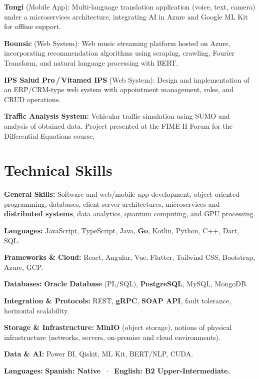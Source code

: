 \documentclass[10pt, letterpaper]{article}
\begin{document}
\smallskip
\noindent\textbf{\color{darkgray}Tongi} \textcolor{midgray}{(Mobile App):}
\textcolor{midgray}{Multi-language translation application (voice, text, camera) under a microservices architecture, integrating AI in Azure and Google ML Kit for offline support.}

\smallskip
\noindent\textbf{\color{darkgray}Bounsic} \textcolor{midgray}{(Web System):}
\textcolor{midgray}{Web music streaming platform hosted on Azure, incorporating recommendation algorithms using scraping, crawling, Fourier Transform, and natural language processing with BERT.}

\smallskip
\noindent\textbf{\color{darkgray}IPS Salud Pro\,/\,Vitamed IPS} \textcolor{midgray}{(Web System):}
\textcolor{midgray}{Design and implementation of an ERP/CRM-type web system with appointment management, roles, and CRUD operations.}

\smallskip
\noindent\textbf{\color{darkgray}Traffic Analysis System:}
\textcolor{midgray}{Vehicular traffic simulation using SUMO and analysis of obtained data. Project presented at the FIME II Forum for the Differential Equations course.}
\normalsize

\section{Technical Skills}

{\small
\noindent\textbf{\color{darkgray}General Skills:}
\textcolor{midgray}{Software and web/mobile app development, object-oriented programming, databases, client-server architectures, microservices and \textbf{distributed systems}, data analytics, quantum computing, and GPU processing.}

\noindent\textbf{\color{darkgray}Languages:}
\textcolor{midgray}{JavaScript, TypeScript, Java, \textbf{Go}, Kotlin, Python, C++, Dart, SQL.}

\noindent\textbf{\color{darkgray}Frameworks \& Cloud:}
\textcolor{midgray}{React, Angular, Vue, Flutter, Tailwind CSS, Bootstrap, Azure, GCP.}

\noindent\textbf{\color{darkgray}Databases:}
\textcolor{midgray}{\textbf{Oracle Database} (PL/SQL), \textbf{PostgreSQL}, MySQL, MongoDB.}

\noindent\textbf{\color{darkgray}Integration \& Protocols:}
\textcolor{midgray}{REST, \textbf{gRPC}, \textbf{SOAP API}, fault tolerance, horizontal scalability.}

\noindent\textbf{\color{darkgray}Storage \& Infrastructure:}
\textcolor{midgray}{\textbf{MinIO} (object storage), notions of physical infrastructure (networks, servers, on-premise and cloud environments).}

\noindent\textbf{\color{darkgray}Data \& AI:}
\textcolor{midgray}{Power BI, Qiskit, ML Kit, BERT/NLP, CUDA.}

\noindent\textbf{\color{darkgray}Languages:}
\textbf{\color{lightaccent}Spanish: Native} \ $\cdot$ \ \textbf{\color{lightaccent}English: B2 Upper-Intermediate.}
}
\end{document}
